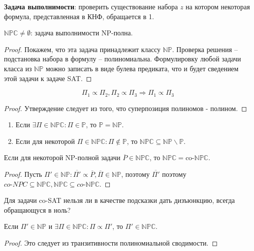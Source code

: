 \documentclass[11pt]{article}
\newcounter{th}\setcounter{th}{0}
\def\th{\par\smallskip\refstepcounter{th}\textbf{\arabic{th}}}
\newtheorem*{Theorem}{Теорема \th}
\newcounter{stnmt}\setcounter{stnmt}{0}
\def\st{\par\smallskip\refstepcounter{stnmt}\textbf{\arabic{stnmt}}}
\newtheorem*{Statement}{Утверждение \st}
\begin{document}
\textbf{Задача выполнимости}: проверить существование набора \(z\) на котором некоторая формула,
представленная в КНФ, обращается в 1.
\begin{Theorem}
$\mathbb{NPC} \neq \emptyset$: задача выполнимости NP-полна.
\end{Theorem}
\begin{proof}
Покажем, что эта задача принадлежит классу $\mathbb{NP}$. Проверка решения -- подстановка
набора в формулу -- полиномиальна. Формулировку любой задачи класса из $\mathbb{NP}$ можно
записать в виде булева предиката, что и будет сведением этой задачи к задаче SAT.
\end{proof}
\begin{Statement}
\begin{equation*}
\Pi_1 \propto \Pi_2, \Pi_2 \propto \Pi_3 \Rightarrow \Pi_1 \propto \Pi_3
\end{equation*}
\end{Statement}
\begin{proof}
Утверждение следует из того, что суперпозиция полиномов - полином.
\end{proof}
\begin{Statement}
\begin{enumerate}
\item Если $\exists \Pi \in \mathbb{NPC}: \Pi \in \mathbb{P}$, то $\mathbb{P} = \mathbb{NP}$.
\item Если для некоторой $\Pi \in \mathbb{NPC}: \Pi \notin \mathbb{P}$, то $\mathbb{NPC} \subseteq \mathbb{NP} \backslash \mathbb{P}$.
\end{enumerate}
\end{Statement}
\begin{Statement}
Если для некоторой NP-полной задачи $\overline{P} \in \mathbb{NPC}$,
то $\mathbb{NPC} = \text{co-}\mathbb{NPC}$.
\end{Statement}
\begin{proof}
Пусть $\Pi' \in \mathbb{NP}: \overline{\Pi'} \propto \overline{P}, \overline{\Pi} \in \mathbb{NP}$,
поэтому $\overline{\Pi'}$ поэтому $\textit{co-}NPC \subseteq \mathbb{NPC}, \mathbb{NPC} \subseteq \textit{co-}\mathbb{NPC}$.
\end{proof}
Для задачи co-SAT нельзя ли в качестве подсказки дать дизъюнкцию, всегда обращающуся в ноль?
\begin{Statement}
Если $\Pi' \in \mathbb{NP}$ и $\exists \Pi \in \mathbb{NPC}: \Pi \propto \Pi'$, то
$\Pi' \in \mathbb{NPC}$.
\end{Statement}
\begin{proof}
Это следует из транзитивности полиномиальной сводимости.
\end{proof}
\end{document}
